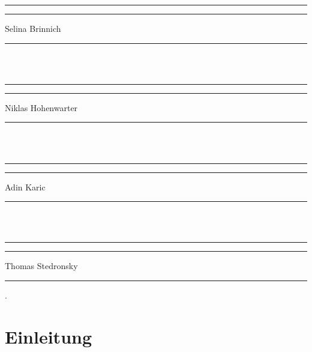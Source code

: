 \documentclass[12pt]{article}
\newcommand\blankpage{%
    \null
    \thispagestyle{empty}%
    \addtocounter{page}{-1}%
    \newpage}
\begin{document}
\hfill \hfill \rule[-0.2cm]{6cm}{0.5pt} \rule[-0.2cm]{2cm}{0pt}

\hfill \hfill Selina Brinnich \rule[-0.2cm]{5.2cm}{0pt}\\ \\

\hfill \hfill \rule[-0.2cm]{6cm}{0.5pt} \rule[-0.2cm]{2cm}{0pt}

\hfill \hfill Niklas Hohenwarter \rule[-0.2cm]{4.4cm}{0pt}\\ \\

\hfill \hfill \rule[-0.2cm]{6cm}{0.5pt} \rule[-0.2cm]{2cm}{0pt}

\hfill \hfill Adin Karic \rule[-0.2cm]{6.0cm}{0pt}\\ \\

\hfill \hfill \rule[-0.2cm]{6cm}{0.5pt} \rule[-0.2cm]{2cm}{0pt}

\hfill \hfill Thomas Stedronsky \rule[-0.2cm]{4.4cm}{0pt}

\newpage

\afterpage{\blankpage}
\vspace*{\fill} 

\label{danksagung}
\vspace*{\fill} 

\newpage

\afterpage{\blankpage}
\vspace*{\fill} 

\label{zitat}
\vspace*{\fill} 

\newpage

\afterpage{\blankpage}
\vspace*{\fill} 

\label{gender}
\vspace*{\fill}

\newpage

\afterpage{\blankpage}



\newpage

{\small\color{white}.}
\vspace{-0.7cm}
\renewcommand*\contentsname{Inhalt}
\tableofcontents

\newpage %

\ofoot{\pagemark}

\section{Einleitung}
\label{sec:einleitung}

\end{document}
